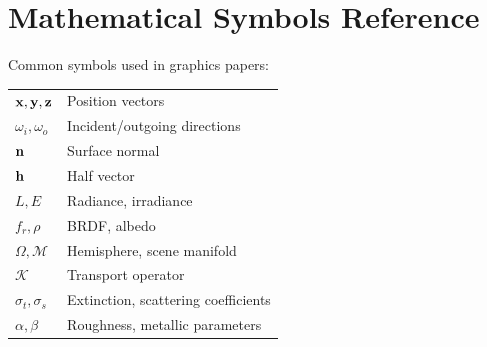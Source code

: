 \documentclass[12pt,a4paper]{article}
\begin{document}
\section{Mathematical Symbols Reference}\label{sec:symbols}
Common symbols used in graphics papers:
\begin{center}
\begin{tabular}{ll}
$\vb{x}, \vb{y}, \vb{z}$ & Position vectors \\
$\omega_i, \omega_o$ & Incident/outgoing directions \\
$\vb{n}$ & Surface normal \\
$\vb{h}$ & Half vector \\
$L, E$ & Radiance, irradiance \\
$f_r, \rho$ & BRDF, albedo \\
$\Omega, \mathcal{M}$ & Hemisphere, scene manifold \\
$\mathcal{K}$ & Transport operator \\
$\sigma_t, \sigma_s$ & Extinction, scattering coefficients \\
$\alpha, \beta$ & Roughness, metallic parameters \\
\end{tabular}
\end{center}
\end{document}
